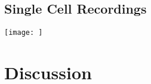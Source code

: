 \documentclass{article}
\begin{document}
\subsection{Single Cell Recordings}

\begin{figure*}
\texttt{[image: ]}
\caption{}
\end{figure*}

\section{Discussion}


\nocite{*}





\appendix
\end{document}

